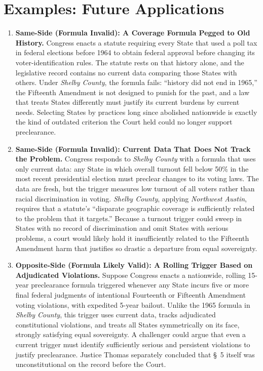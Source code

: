 \documentclass[12pt]{article}
\begin{document}
\section{Examples: Future Applications}
\begin{enumerate}

\item \textbf{Same-Side (Formula Invalid): A Coverage Formula Pegged to Old History.} Congress enacts a statute requiring every State that used a poll tax in federal elections before 1964 to obtain federal approval before changing its voter-identification rules. The statute rests on that history alone, and the legislative record contains no current data comparing those States with others. Under \emph{Shelby County}, the formula fails: ``history did not end in 1965,'' the Fifteenth Amendment is not designed to punish for the past, and a law that treats States differently must justify its current burdens by current needs. Selecting States by practices long since abolished nationwide is exactly the kind of outdated criterion the Court held could no longer support preclearance.

\item \textbf{Same-Side (Formula Invalid): Current Data That Does Not Track the Problem.} Congress responds to \emph{Shelby County} with a formula that uses only current data: any State in which overall turnout fell below 50\% in the most recent presidential election must preclear changes to its voting laws. The data are fresh, but the trigger measures low turnout of all voters rather than racial discrimination in voting. \emph{Shelby County}, applying \emph{Northwest Austin}, requires that a statute's ``disparate geographic coverage is sufficiently related to the problem that it targets.'' Because a turnout trigger could sweep in States with no record of discrimination and omit States with serious problems, a court would likely hold it insufficiently related to the Fifteenth Amendment harm that justifies so drastic a departure from equal sovereignty.

\item \textbf{Opposite-Side (Formula Likely Valid): A Rolling Trigger Based on Adjudicated Violations.} Suppose Congress enacts a nationwide, rolling 15-year preclearance formula triggered whenever any State incurs five or more final federal judgments of intentional Fourteenth or Fifteenth Amendment voting violations, with expedited 5-year bailout. Unlike the 1965 formula in \emph{Shelby County}, this trigger uses current data, tracks adjudicated constitutional violations, and treats all States symmetrically on its face, strongly satisfying equal sovereignty. A challenger could argue that even a current trigger must identify sufficiently serious and persistent violations to justify preclearance. Justice Thomas separately concluded that \S~5 itself was unconstitutional on the record before the Court.


\end{enumerate}
\end{document}
